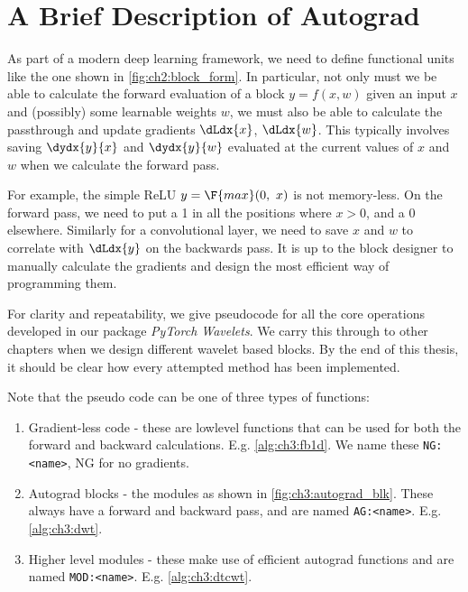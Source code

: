 \section{A Brief Description of Autograd}
As part of a modern deep learning framework, we need to define functional units like 
the one shown in \autoref{fig:ch2:block_form}. In particular, not only must we
be able to calculate the forward evaluation of a block $y=f(x,w)$ given an input $x$ and 
(possibly) some learnable weights $w$, we must also be able to
calculate the passthrough and update gradients $\dLdx{x}$, $\dLdx{w}$. This
typically involves saving $\dydx{y}{x}$ and $\dydx{y}{w}$ evaluated at the current
values of $x$ and $w$ when we calculate the forward pass. 

For example, the simple ReLU $y = \F{max}(0,\ x)$ is not memory-less. On the
forward pass, we need to put a 1 in all the positions where $x > 0$, and a 0
elsewhere. Similarly for a convolutional layer, we need to save $x$ and $w$ to
correlate with $\dLdx{y}$ on the backwards pass. It is up to the block designer
to manually calculate the gradients and design the most efficient way of
programming them.

For clarity and repeatability, we give pseudocode for all the core operations
developed in our package \emph{PyTorch Wavelets}. We carry this through to other chapters
when we design different wavelet based blocks. By the end of this thesis, it should be
clear how every attempted method has been implemented.


Note that the pseudo code can be one of three types of functions:
\begin{enumerate}
  \item Gradient-less code - these are lowlevel functions that can be used for
    both the forward and backward calculations. E.g. \autoref{alg:ch3:fb1d}. We
    name these \texttt{NG:<name>}, NG for no gradients.
  \item Autograd blocks - the modules as shown in
    \autoref{fig:ch3:autograd_blk}. These always have a forward and backward pass, and 
    are named \texttt{AG:<name>}. E.g. \autoref{alg:ch3:dwt}.
  \item Higher level modules - these make use of efficient autograd functions
    and are named \texttt{MOD:<name>}. E.g. \autoref{alg:ch3:dtcwt}.
\end{enumerate}

